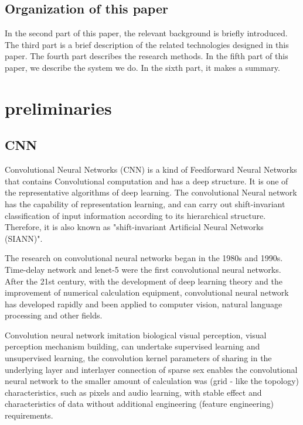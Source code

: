 \documentclass[conference]{IEEEtran}
\begin{document}
\subsection{Organization of this paper}
In the second part of this paper, the relevant background is briefly introduced. The third part is a brief description of the related technologies designed in this paper. The fourth part describes the research methods. In the fifth part of this paper, we describe the system we do. In the sixth part, it makes a summary.

\section{preliminaries}

\subsection{CNN}
Convolutional Neural Networks (CNN) is a kind of Feedforward Neural Networks that contains Convolutional computation and has a deep structure. It is one of the representative algorithms of deep learning. The convolutional Neural network has the capability of representation learning, and can carry out shift-invariant classification of input information according to its hierarchical structure. Therefore, it is also known as "shift-invariant Artificial Neural Networks (SIANN)".

The research on convolutional neural networks began in the 1980s and 1990s. Time-delay network and lenet-5 were the first convolutional neural networks. After the 21st century, with the development of deep learning theory and the improvement of numerical calculation equipment, convolutional neural network has developed rapidly and been applied to computer vision, natural language processing and other fields.

Convolution neural network imitation biological visual perception, visual perception mechanism building, can undertake supervised learning and unsupervised learning, the convolution kernel parameters of sharing in the underlying layer and interlayer connection of sparse sex enables the convolutional neural network to the smaller amount of calculation was (grid - like the topology) characteristics, such as pixels and audio learning, with stable effect and characteristics of data without additional engineering (feature engineering) requirements.
\end{document}
